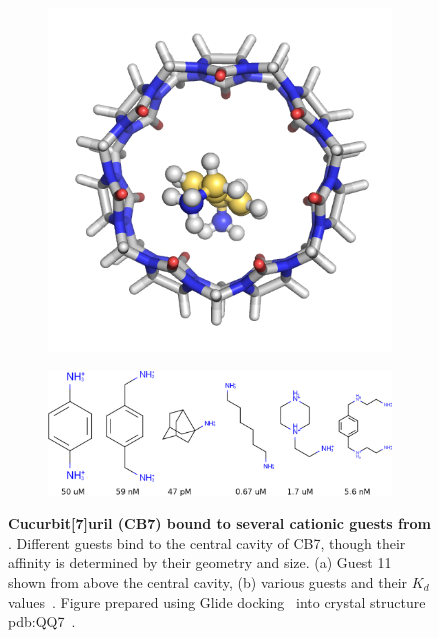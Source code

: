 \documentclass[10pt,final]{article}
\begin{document}
\begin{figure}
\centering
\begin{subfigure}{.5\textwidth}
  \centering
  \includegraphics[width=.5\linewidth]{figures/guest11_top.png}
  \caption{ }
  \label{fig:sub1}
\end{subfigure}%
\begin{subfigure}{.5\textwidth}
  \centering
  \includegraphics[width=\linewidth]{figures/Kd_guest.png}
  \caption{ }
  \label{fig:sub2}
\end{subfigure}
\caption{\textbf{Cucurbit[7]uril (CB7) bound to several cationic guests from \textcite{Cao2013a}}. Different guests bind to the central cavity of CB7, though their affinity is determined by their geometry and size. (a) Guest 11 shown from above the central cavity, (b) various guests and their $K_d$ values~\cite{Cao2013a}. Figure prepared using Glide docking~\cite{Halgren2004a,Friesner2004a,Friesner2006a,Schroedinger2014a} into crystal structure pdb:QQ7~\cite{Feng2004a}.}
\label{figure:host-guest}
\end{figure}
\end{document}
